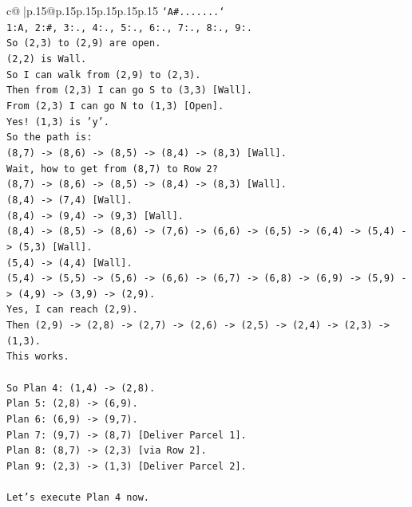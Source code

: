 \documentclass{article}
\begin{document}
{\begin{supertabular}{c@{$\;$}|p{.15\linewidth}@{}p{.15\linewidth}p{.15\linewidth}p{.15\linewidth}p{.15\linewidth}p{.15\linewidth}}
{{{\texttt{`A\#.......`} \\
\texttt{1:A, 2:\#, 3:., 4:., 5:., 6:., 7:., 8:., 9:.} \\
\texttt{So (2,3) to (2,9) are open.} \\
\texttt{(2,2) is Wall.} \\
\texttt{So I can walk from (2,9) to (2,3).} \\
\texttt{Then from (2,3) I can go S to (3,3) {[}Wall{]}.} \\
\texttt{From (2,3) I can go N to (1,3) {[}Open{]}.} \\
\texttt{Yes! (1,3) is 'y'.} \\
\texttt{So the path is:} \\
\texttt{(8,7) {-}> (8,6) {-}> (8,5) {-}> (8,4) {-}> (8,3) {[}Wall{]}.} \\
\texttt{Wait, how to get from (8,7) to Row 2?} \\
\texttt{(8,7) {-}> (8,6) {-}> (8,5) {-}> (8,4) {-}> (8,3) {[}Wall{]}.} \\
\texttt{(8,4) {-}> (7,4) {[}Wall{]}.} \\
\texttt{(8,4) {-}> (9,4) {-}> (9,3) {[}Wall{]}.} \\
\texttt{(8,4) {-}> (8,5) {-}> (8,6) {-}> (7,6) {-}> (6,6) {-}> (6,5) {-}> (6,4) {-}> (5,4) {-}> (5,3) {[}Wall{]}.} \\
\texttt{(5,4) {-}> (4,4) {[}Wall{]}.} \\
\texttt{(5,4) {-}> (5,5) {-}> (5,6) {-}> (6,6) {-}> (6,7) {-}> (6,8) {-}> (6,9) {-}> (5,9) {-}> (4,9) {-}> (3,9) {-}> (2,9).} \\
\texttt{Yes, I can reach (2,9).} \\
\texttt{Then (2,9) {-}> (2,8) {-}> (2,7) {-}> (2,6) {-}> (2,5) {-}> (2,4) {-}> (2,3) {-}> (1,3).} \\
\texttt{This works.} \\
\\ 
\texttt{So Plan 4: (1,4) {-}> (2,8).} \\
\texttt{Plan 5: (2,8) {-}> (6,9).} \\
\texttt{Plan 6: (6,9) {-}> (9,7).} \\
\texttt{Plan 7: (9,7) {-}> (8,7) {[}Deliver Parcel 1{]}.} \\
\texttt{Plan 8: (8,7) {-}> (2,3) {[}via Row 2{]}.} \\
\texttt{Plan 9: (2,3) {-}> (1,3) {[}Deliver Parcel 2{]}.} \\
\\ 
\texttt{Let's execute Plan 4 now.} \\
}}}
\end{supertabular}}
\end{document}
